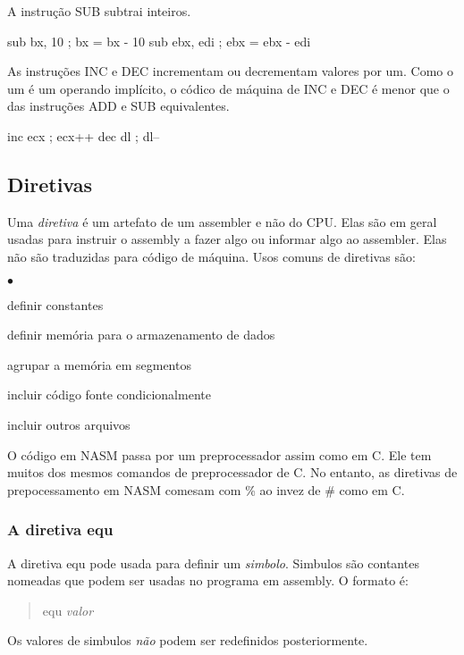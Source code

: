 A instrução {\code SUB}  subtrai inteiros.
\begin{AsmCodeListing}[frame=none, numbers=none]
      sub    bx, 10   ; bx = bx - 10
      sub    ebx, edi ; ebx = ebx - edi
\end{AsmCodeListing}

As instruções {\code INC}  e {\code DEC}  incrementam ou
decrementam valores por um. Como o um é um operando implícito, o códico de
máquina de {\code INC} e {\code DEC} é menor que o das instruções {\code ADD} e 
{\code SUB} equivalentes.
\begin{AsmCodeListing}[frame=none, numbers=none]
      inc    ecx      ; ecx++
      dec    dl       ; dl--
\end{AsmCodeListing}

\subsection{Diretivas}

Uma \emph{diretiva} é um artefato de um assembler e não do CPU. Elas são em
geral usadas para instruir o assembly a fazer algo ou informar algo ao 
assembler. Elas não são traduzidas para código de máquina. Usos comuns de
diretivas são:
\begin{list}{$\bullet$}{\setlength{\itemsep}{0pt}}
\item definir constantes
\item definir memória para o armazenamento de dados
\item agrupar a memória em segmentos
\item incluir código fonte condicionalmente
\item incluir outros arquivos
\end{list}

O código em NASM passa por um preprocessador assim como em C. Ele tem muitos
dos mesmos comandos de preprocessador de C. No entanto, as diretivas de
prepocessamento em NASM comesam com \% ao invez de \# como em C.

\subsubsection{A diretiva equ}

A diretiva {\code equ} pode usada para definir um \emph{simbolo}. Simbulos são
contantes nomeadas que podem ser usadas no programa em assembly. O formato é:
\begin{quote}
   equ {\em valor}
\end{quote}
Os valores de simbulos \emph{não} podem ser redefinidos posteriormente.

